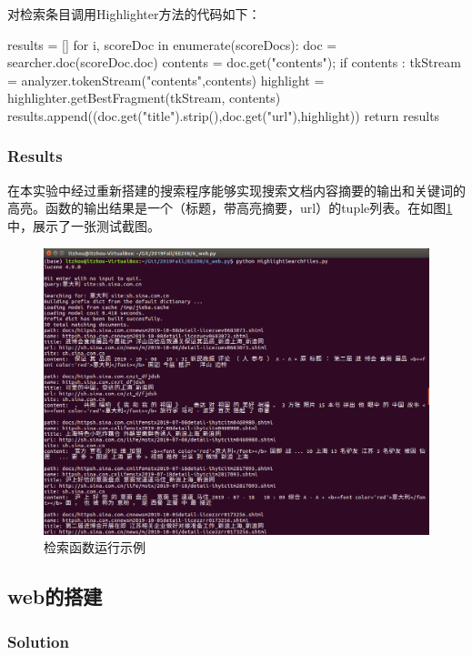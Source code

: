 \documentclass{article}
\begin{document}
对检索条目调用Highlighter方法的代码如下：
\begin{python}
results = []
for i, scoreDoc in enumerate(scoreDocs):
    doc = searcher.doc(scoreDoc.doc)
    contents = doc.get("contents");
    if contents :
        tkStream = analyzer.tokenStream("contents",contents)
        highlight = highlighter.getBestFragment(tkStream, contents)
    results.append((doc.get("title").strip(),doc.get("url"),highlight))
return results
\end{python}

\subsubsection{Results}
在本实验中经过重新搭建的搜索程序能够实现搜索文档内容摘要的输出和关键词的高亮。函数的输出结果是一个（标题，带高亮摘要，url）的tuple列表。在如图\ref{fig:highlightsearch}中，展示了一张测试截图。

\begin{figure}[htbp]
\centering
\includegraphics[width=14.5cm]{img/highlightsearch.png}
\caption{检索函数运行示例}
\label{fig:highlightsearch}
\end{figure}

\subsection{web的搭建}

\subsubsection{Solution}
\end{document}
